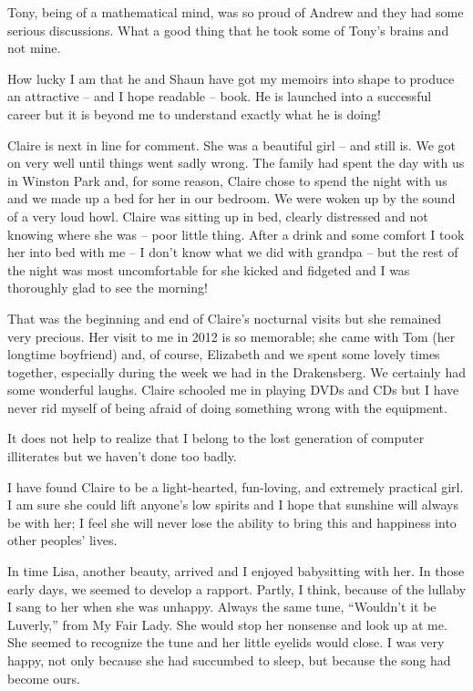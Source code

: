 Tony, being of a mathematical mind, was so proud of Andrew and they
had some serious discussions. What a good thing that he took some of
Tony's brains and not mine.

How lucky I am that he and Shaun have got my memoirs into shape to
produce an attractive -- and I hope readable -- book. He is launched
into a successful career but it is beyond me to understand exactly
what he is doing!

Claire is next in line for comment. She was a beautiful girl -- and
still is. We got on very well until things went sadly wrong. The
family had spent the day with us in Winston Park and, for some reason,
Claire chose to spend the night with us and we made up a bed for her
in our bedroom. We were woken up by the sound of a very loud
howl. Claire was sitting up in bed, clearly distressed and not knowing
where she was -- poor little thing. After a drink and some comfort I
took her into bed with me -- I don't know what we did with grandpa --
but the rest of the night was most uncomfortable for she kicked and
fidgeted and I was thoroughly glad to see the morning!

That was the beginning and end of Claire's nocturnal visits but she
remained very precious. Her visit to me in 2012 is so memorable; she
came with Tom (her longtime boyfriend) and, of course, Elizabeth and
we spent some lovely times together, especially during the week we had
in the Drakensberg. We certainly had some wonderful laughs. Claire
schooled me in playing DVDs and CDs but I have never rid myself of
being afraid of doing something wrong with the equipment.

It does not help to realize that I belong to the lost generation of
computer illiterates but we haven't done too badly.

I have found Claire to be a light-hearted, fun-loving, and extremely
practical girl. I am sure she could lift anyone's low spirits and I
hope that sunshine will always be with her; I feel she will never lose
the ability to bring this and happiness into other peoples' lives.

In time Lisa, another beauty, arrived and I enjoyed babysitting with
her. In those early days, we seemed to develop a rapport. Partly, I
think, because of the lullaby I sang to her when she was
unhappy. Always the same tune, ``Wouldn't it be Luverly,'' from My
Fair Lady. She would stop her nonsense and look up at me. She seemed
to recognize the tune and her little eyelids would close. I was very
happy, not only because she had succumbed to sleep, but because the
song had become ours.

